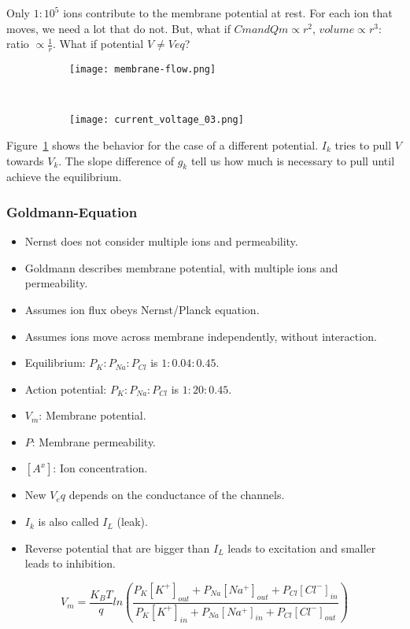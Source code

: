 \documentclass[main]{subfiles}
\begin{document}
Only $1:10^5$ ions contribute to the membrane potential at rest. For each ion that moves, we need a lot that do not.
But, what if $Cm and Qm \propto r^2$, $volume \propto r^3$: ratio $\propto \frac{1}{r}$.
What if potential $V \neq Veq$?

\begin{figure}[H]
	\centering
	\begin{subfigure}[b]{0.5\textwidth}
		\centering
		\texttt{[image: membrane-flow.png]}
	\end{subfigure}%
	~
	\begin{subfigure}[b]{0.3\textwidth}
		\centering
		\texttt{[image: current\_voltage\_03.png]}
	\end{subfigure}
	\label{fig:membrane-flow}
\end{figure}

Figure~\ref{fig:membrane-flow} shows the behavior for the case of a different potential. $I_k$ tries to pull $V$ towards $V_k$. The slope difference of $g_k$ tell us how much is necessary to pull until achieve the equilibrium.

\subsubsection{Goldmann-Equation}
\begin{itemize}[noitemsep,nolistsep]
	\item Nernst does not consider multiple ions and permeability.
	\item Goldmann describes membrane potential, with multiple ions and permeability.
	\item Assumes ion flux obeys Nernst/Planck equation.
	\item Assumes ions move across membrane independently, without interaction.
	\item Equilibrium: $P_K:P_{Na}:P_{Cl}$ is $1:0.04:0.45$.
	\item Action potential: $P_K:P_{Na}:P_{Cl}$ is $1:20:0.45$.
	\item $V_m$: Membrane potential.
	\item $P$: Membrane permeability.
	\item $[A^x]$: Ion concentration.
	\item New $V_eq$ depends on the conductance of the channels.
	\item $I_k$ is also called $I_L$ (leak). 
	\item Reverse potential that are bigger than $I_L$ leads to excitation and smaller leads to inhibition.
\end{itemize}

\[V_m = \frac{K_BT}{q} ln(\frac{P_K[K^+]_{out} + P_{Na}[Na^+]_{out} + P_{Cl}[Cl^{-}]_{in}}{P_K[K^+]_{in} + P_{Na}[Na^+]_{in} + P_{Cl}[Cl^{-}]_{out}})\]
\end{document}
